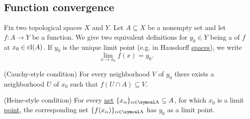\subsection{Function convergence}\label{subsec:function_convergence}

\begin{definition}\label{def:local_convergence}
  Fix two topological spaces \( X \) and \( Y \). Let \( A \subseteq X \) be a nonempty set and let \( f: A \to Y \) be a function. We give two equivalent definitions for \( y_0 \in Y \) being a  of \( f \) at \( x_0 \in \operatorname{cl}(A) \). If \( y_0 \) is the unique limit point (e.g. in Hausdorff \hyperref[thm:t2_iff_singleton_limits]{spaces}), we write
  \begin{equation*}
    \lim_{x \to x_0} f(x) = y_0.
  \end{equation*}

  \begin{defenum}
    (Cauchy-style condition) For every neighborhood \( V \) of \( y_0 \) there exists a neighborhood \( U \) of \( x_0 \) such that \( f(U \cap A) \subseteq V \).

    (Heine-style condition) For every \hyperref[def:topological_net]{net} \( \{ x_\al \}_{\al \in \CA} \subseteq A \), for which \( x_0 \) is a limit \hyperref[def:net_convergence/limit]{point}, the corresponding net \( \{ f(x_\al) \}_{\al \in \CA} \) has \( y_0 \) as a limit point.
  \end{defenum}
\end{definition}
